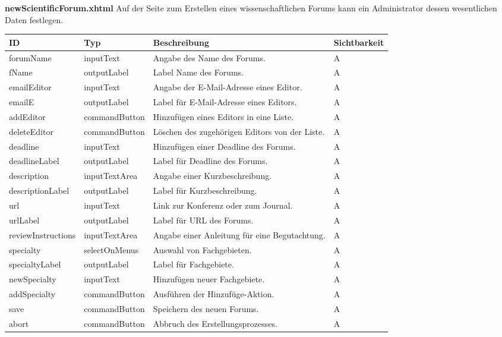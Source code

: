 \textbf{newScientificForum.xhtml} Auf der Seite zum Erstellen eines wissenschaftlichen Forums kann ein Administrator dessen wesentlichen Daten festlegen.

\begin{tabular}[H]{|m{2cm}|m{3cm}|m{6cm}|m{2.5cm}|}
    \hline
    \textbf{ID} & \textbf{Typ} & \textbf{Beschreibung} & \textbf{Sichtbarkeit} \\
    \hline
    \hline
    forumName & inputText & Angabe des Name des Forums. & A\\
    \hline
    fName & outputLabel & Label Name des Forums. & A\\
    \hline
    emailEditor & inputText & Angabe der E-Mail-Adresse eines Editor. & A\\
    \hline
    emailE & outputLabel & Label für E-Mail-Adresse eines Editors. & A\\
    \hline
    addEditor & commandButton & Hinzufügen eines Editors in eine Liste. & A\\
    \hline
    deleteEditor & commandButton & Löschen des zugehörigen Editors von der Liste. & A\\
    \hline
    deadline & inputText & Hinzufügen einer Deadline des Forums. & A\\
    \hline
    deadlineLabel & outputLabel & Label für Deadline des Forums. & A\\
    \hline
    description & inputTextArea & Angabe einer Kurzbeschreibung. & A\\
    \hline
    descriptionLabel & outputLabel & Label für Kurzbeschreibung. & A\\
    \hline
    url & inputText & Link zur Konferenz oder zum Journal. & A\\
    \hline
    urlLabel & outputLabel & Label für URL des Forums. & A\\
    \hline
    reviewInstructions  & inputTextArea & Angabe einer Anleitung für eine Begutachtung. & A\\
    \hline
    specialty & selectOnMenus & Auswahl von Fachgebieten. & A\\
    \hline
    specialtyLabel & outputLabel & Label für Fachgebiete. & A\\
    \hline
    newSpecialty & inputText & Hinzufügen neuer Fachgebiete. & A\\
    \hline
    addSpecialty & commandButton & Ausführen der Hinzufüge-Aktion. & A\\
    \hline
    save & commandButton & Speichern des neuen Forums. & A\\
    \hline
    abort & commandButton & Abbruch des Erstellungsprozesses. & A\\
    \hline
\end{tabular}

